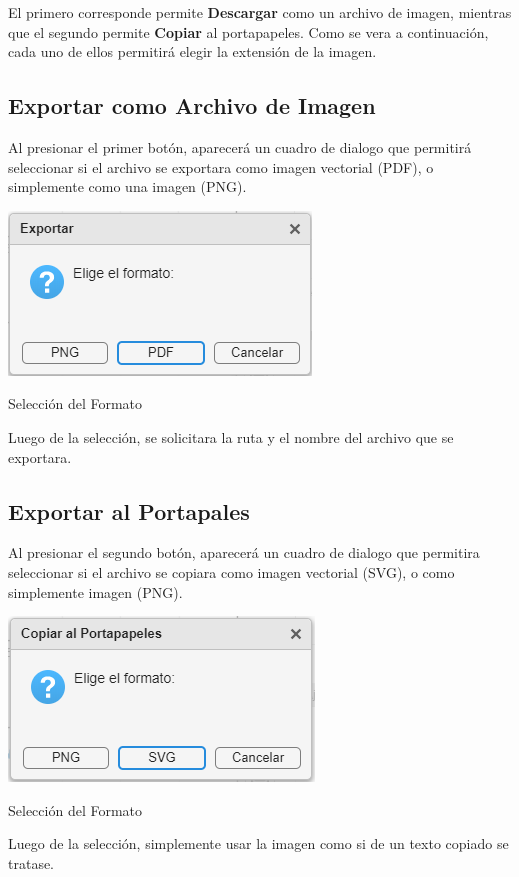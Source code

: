 El primero corresponde permite \textbf{Descargar} como un archivo de imagen, mientras que el segundo permite \textbf{Copiar} al portapapeles. Como se vera a continuación, cada uno de ellos permitirá elegir la extensión de la imagen.



\subsection{Exportar como Archivo de Imagen}
Al presionar el primer botón, aparecerá un cuadro de dialogo que permitirá seleccionar si el archivo se exportara como imagen vectorial (PDF), o simplemente como una imagen (PNG).
\begin{center}
	\includegraphics[width=0.4\columnwidth]{images/Export_ImageFile}
	\captionsetup{type=figure}
	\caption{Selección del Formato}
	\label{fig:007}
\end{center}

Luego de la selección, se solicitara la ruta y el nombre del archivo que se exportara.


\subsection{Exportar al Portapales}
Al presionar el segundo botón, aparecerá un cuadro de dialogo que permitira seleccionar si el archivo se copiara como imagen vectorial (SVG), o como simplemente imagen (PNG).

\begin{center}
	\includegraphics[width=0.4\columnwidth]{images/Export_Clipboard}
	\captionsetup{type=figure}
	\caption{Selección del Formato}
	\label{fig:008}
\end{center}

Luego de la selección, simplemente usar la imagen como si de un texto copiado se tratase.


























